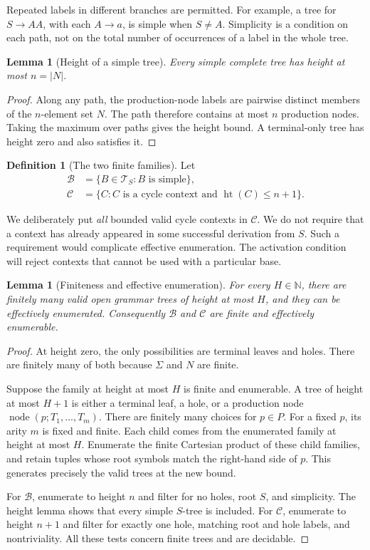 \documentclass[11pt,a4paper]{article}
\numberwithin{equation}{section}
\theoremstyle{plain}
\newtheorem{lemma}[theorem]{Lemma}
\theoremstyle{definition}
\newtheorem{definition}[theorem]{Definition}
\theoremstyle{remark}
\newcommand{\N}{\mathbb N}
\newcommand{\treeheight}{\operatorname{ht}}
\newcommand{\Trees}{\mathcal T}
\newcommand{\Bases}{\mathcal B}
\newcommand{\Cycles}{\mathcal C}
\begin{document}
Repeated labels in different branches are permitted. For example, a tree for $S\to AA$, with each $A\to a$, is simple when $S\neq A$. Simplicity is a condition on each path, not on the total number of occurrences of a label in the whole tree.

\begin{lemma}[Height of a simple tree]\label{lem:simple-height}
Every simple complete tree has height at most $n=|N|$.
\end{lemma}
\begin{proof}
Along any path, the production-node labels are pairwise distinct members of the $n$-element set $N$. The path therefore contains at most $n$ production nodes. Taking the maximum over paths gives the height bound. A terminal-only tree has height zero and also satisfies it.
\end{proof}

\begin{definition}[The two finite families]\label{def:families}
Let
\begin{align*}
\Bases&=\{B\in\Trees_S:B\text{ is simple}\},\\
\Cycles&=\{C:C\text{ is a cycle context and }\treeheight(C)\leq n+1\}.
\end{align*}
\end{definition}

We deliberately put \emph{all} bounded valid cycle contexts in $\Cycles$. We do not require that a context has already appeared in some successful derivation from $S$. Such a requirement would complicate effective enumeration. The activation condition will reject contexts that cannot be used with a particular base.

\begin{lemma}[Finiteness and effective enumeration]\label{lem:finite}
For every $H\in\N$, there are finitely many valid open grammar trees of height at most $H$, and they can be effectively enumerated. Consequently $\Bases$ and $\Cycles$ are finite and effectively enumerable.
\end{lemma}
\begin{proof}
At height zero, the only possibilities are terminal leaves and holes. There are finitely many of both because $\Sigma$ and $N$ are finite.

Suppose the family at height at most $H$ is finite and enumerable. A tree of height at most $H+1$ is either a terminal leaf, a hole, or a production node $\operatorname{node}(p;T_1,\ldots,T_m)$. There are finitely many choices for $p\in P$. For a fixed $p$, its arity $m$ is fixed and finite. Each child comes from the enumerated family at height at most $H$. Enumerate the finite Cartesian product of these child families, and retain tuples whose root symbols match the right-hand side of $p$. This generates precisely the valid trees at the new bound.

For $\Bases$, enumerate to height $n$ and filter for no holes, root $S$, and simplicity. The height lemma shows that every simple $S$-tree is included. For $\Cycles$, enumerate to height $n+1$ and filter for exactly one hole, matching root and hole labels, and nontriviality. All these tests concern finite trees and are decidable.
\end{proof}
\end{document}
